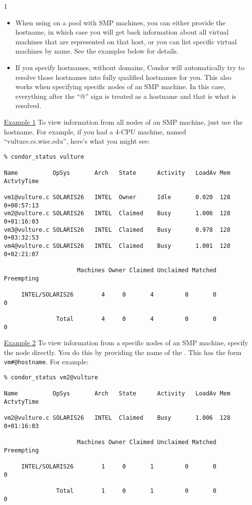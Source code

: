 \begin{ManPage}{\label{man-condor-status}}{1}
\begin{itemize}
	\item When using  on a pool with SMP machines,
	you can either provide the hostname, in which case you will
	get back information about all virtual machines that are
	represented on that host, or you can list specific virtual
	machines by name.  
	See the examples below for details.

	\item If you specify hostnames, without domains, Condor will
	automatically try to resolve those hostnames into fully
	qualified hostnames for you.
	This also works when specifying specific nodes of an SMP
	machine.
	In this case, everything after the ``@'' sign is treated as a
	hostname and that is what is resolved.
\end{itemize}

\Examples

\underline{Example 1} To view information from all nodes of an SMP
machine, just use the hostname.
For example, if you had a 4-CPU machine, named
``vulture.cs.wisc.edu'', here's what you might see:
\begin{verbatim}
% condor_status vulture

Name          OpSys       Arch   State      Activity   LoadAv Mem   ActvtyTime

vm1@vulture.c SOLARIS26   INTEL  Owner      Idle       0.020  128   0+00:57:13
vm2@vulture.c SOLARIS26   INTEL  Claimed    Busy       1.006  128   0+01:16:03
vm3@vulture.c SOLARIS26   INTEL  Claimed    Busy       0.978  128   0+03:32:53
vm4@vulture.c SOLARIS26   INTEL  Claimed    Busy       1.001  128   0+02:21:07

                     Machines Owner Claimed Unclaimed Matched Preempting

     INTEL/SOLARIS26        4     0       4         0       0          0

               Total        4     0       4         0       0          0
\end{verbatim}

\underline{Example 2} To view information from a specific nodes of an
SMP machine, specify the node directly.
You do this by providing the name of the .
This has the form \texttt{vm\#@hostname}.
For example:
\begin{verbatim}
% condor_status vm2@vulture

Name          OpSys       Arch   State      Activity   LoadAv Mem   ActvtyTime

vm2@vulture.c SOLARIS26   INTEL  Claimed    Busy       1.006  128   0+01:16:03

                     Machines Owner Claimed Unclaimed Matched Preempting

     INTEL/SOLARIS26        1     0       1         0       0          0

               Total        1     0       1         0       0          0
\end{verbatim}

\end{ManPage}

